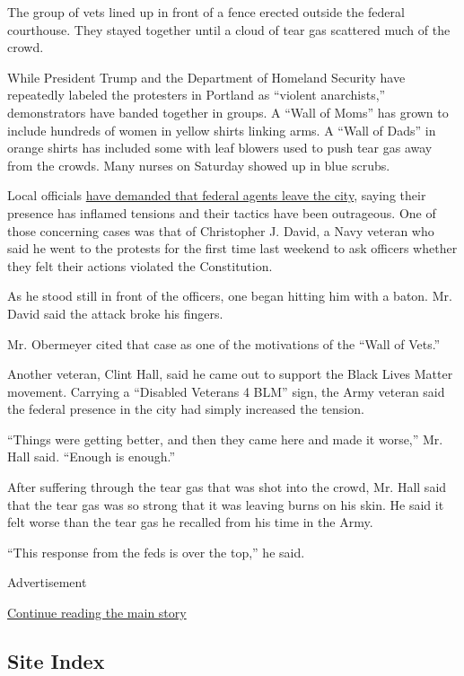 The group of vets lined up in front of a fence erected outside the
federal courthouse. They stayed together until a cloud of tear gas
scattered much of the crowd.

While President Trump and the Department of Homeland Security have
repeatedly labeled the protesters in Portland as ``violent anarchists,''
demonstrators have banded together in groups. A ``Wall of Moms'' has
grown to include hundreds of women in yellow shirts linking arms. A
``Wall of Dads'' in orange shirts has included some with leaf blowers
used to push tear gas away from the crowds. Many nurses on Saturday
showed up in blue scrubs.

Local officials
\href{https://www.nytimes.com/2020/07/23/us/portland-protest-tear-gas-mayor.html}{have
demanded that federal agents leave the city}, saying their presence has
inflamed tensions and their tactics have been outrageous. One of those
concerning cases was that of Christopher J. David, a Navy veteran who
said he went to the protests for the first time last weekend to ask
officers whether they felt their actions violated the Constitution.

As he stood still in front of the officers, one began hitting him with a
baton. Mr. David said the attack broke his fingers.

Mr. Obermeyer cited that case as one of the motivations of the ``Wall of
Vets.''

Another veteran, Clint Hall, said he came out to support the Black Lives
Matter movement. Carrying a ``Disabled Veterans 4 BLM'' sign, the Army
veteran said the federal presence in the city had simply increased the
tension.

``Things were getting better, and then they came here and made it
worse,'' Mr. Hall said. ``Enough is enough.''

After suffering through the tear gas that was shot into the crowd, Mr.
Hall said that the tear gas was so strong that it was leaving burns on
his skin. He said it felt worse than the tear gas he recalled from his
time in the Army.

``This response from the feds is over the top,'' he said.

Advertisement

\protect\hyperlink{after-bottom}{Continue reading the main story}

\hypertarget{site-index}{%
\subsection{Site Index}\label{site-index}}

